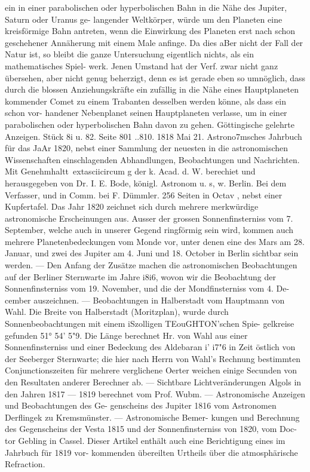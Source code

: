 \documentclass[12pt,a4paper]{article}
\begin{document}
{{{{{{{{ein  in  einer  parabolischen  oder  hyperbolischen  Bahn  in  die  Nähe  des  Jupiter,  Saturn  oder  Uranus  ge- langender Weltkörper,  würde  um  den  Planeten  eine  kreisförmige  Bahn  antreten,  wenn  die  Einwirkung des  Planeten  erst  nach  schon  geschehener  Annäherung  mit  einem  Male  anfinge.  Da  dies  aBer  nicht  der Fall  der  Natur  ist,  so  bleibt  die  ganze  Untersuchung  eigentlich  nichts,  als  ein  mathematisches  Spiel- werk. Jenen  Umstand  hat  der  Verf.  zwar  nicht  ganz  übersehen,  aber  nicht  genug  beherzigt,  denn  es ist  gerade  eben  so  umnöglich,  dass  durch  die  blossen  Anziehungskräfte  ein  zufällig  in  die  Nähe  eines Hauptplaneten  kommender  Comet  zu  einem  Trabanten  desselben  werden  könne,  als  dass  ein  schon  vor- handener Nebenplanet  seinen  Hauptplaneten  verlasse,  um  in  einer  parabolischen  oder  hyperbolischen Bahn  davon  zu  gehen. Göttingische  gelehrte  Anzeigen.     Stück  8i  u.  82.     Seite  801  ..810.     1818  Mai  21. Astrono7msches  Jahrbuch  für  das  JaAr  1820,  nebst  einer  Sammlung  der  neuesten  in  die  astronomischen Wissenschaften  einschlagenden  Abhandlungen,  Beobachtungen  und  Nachrichten.  Mit  Genehmhaltt\	extasciicircum{}{ }g  der  k. Acad.  d.  W.  berechiet  und  herausgegeben  von  Dr.  I.  E.  Bode,  königl.  Astronom  u.  s,  w.  Berlin.  Bei  dem Verfasser,  und  in  Comm.  bei  F.  Dümmler.    256  Seiten  in  Octav ,  nebst  einer  Kupfertafel. Das  Jahr  1820  zeichnet  sich  durch  mehrere  merkwürdige  astronomische  Erscheinungen  aus.  Ausser der  grossen  Sonnenfinsterniss  vom  7.  September,  welche  auch  in  unserer  Gegend  ringförmig  sein  wird, kommen  auch  mehrere  Planetenbedeckungen  vom  Monde  vor,  unter  denen  eine  des  Mars  am  28.  Januar, und  zwei  des  Jupiter  am  4.  Juni  und  18.  October  in  Berlin  sichtbar  sein  werden.  ---  Den  Anfang  der Zusätze  machen  die  astronomischen  Beobachtungen  auf  der  Berliner  Sternwarte  im  Jahre  i8i6,  wovon wir  die  Beobachtung  der  Sonnenfinsterniss  vom  19.  November,  und  die  der  Mondfinsterniss  vom  4.  De- cember  auszeichnen.  ---  Beobachtungen  in  Halberstadt  vom  Hauptmann  von  Wahl.  Die  Breite  von Halberstadt  (Moritzplan),  wurde  durch  Sonnenbeobachtungen  mit  einem  iSzolligen  TEouGHTON'schen  Spie- gelkreise gefunden  51°  54'  5"9.  Die  Länge  berechnet  Hr.  von  Wahl  aus  einer  Sonnenfinsterniss  und  einer Bedeckung  des  Aldebaran  i'  i7"6  in  Zeit  östlich  von  der  Seeberger  Sternwarte;  die  hier  nach  Herrn von  Wahl's  Rechnung  bestimmten  Conjunctionszeiten  für  mehrere  verglichene  Oerter  weichen  einige Secunden  von  den  Resultaten  anderer  Berechner  ab.  ---  Sichtbare  Lichtveränderungen  Algols  in  den Jahren  1817 --- 1819  berechnet  vom  Prof.  Wubm.  ---  Astronomische  Anzeigen  und  Beobachtungen  des  Ge- genscheins des  Jupiter  1816  vom  Astronomen  Derflingek  zu  Kremsmünster.  ---  Astronomische  Bemer- kungen und  Berechnung  des  Gegenscheins  der  Vesta  1815  und  der  Sonnenfinsterniss  von  1820,  vom  Doc- tor  Gebling  in  Cassel.  Dieser  Artikel  enthält  auch  eine  Berichtigung  eines  im  Jahrbuch  für  1819  vor- kommenden übereilten  Urtheils  über  die  atmosphärische  Refraction.  }}}}}}}}
\end{document}
